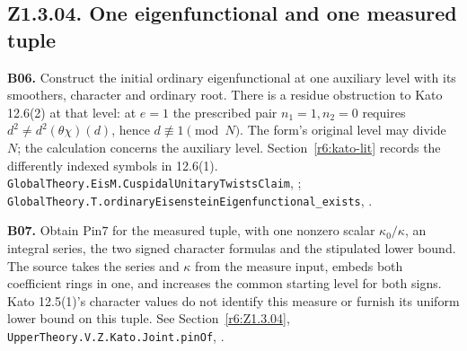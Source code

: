 \subsection{Z1.3.04. One eigenfunctional and one measured tuple}\label{r7:Z1.3.04}
\textbf{B06.} Construct the initial ordinary eigenfunctional at one
auxiliary level with its smoothers, character and ordinary root.
There is a residue obstruction to Kato 12.6(2) at that level: at
\(e=1\) the prescribed pair \(n_1=1,n_2=0\) requires
\(d^2\ne d^2(\theta\chi)(d)\), hence \(d\not\equiv1\pmod N\).
The form's original level may divide \(N\); the calculation concerns the
auxiliary level. Section~\ref{r6:kato-lit} records the differently
indexed symbols in 12.6(1).
\nolinkurl{GlobalTheory.EisM.CuspidalUnitaryTwistsClaim},
;
\nolinkurl{GlobalTheory.T.ordinaryEisensteinEigenfunctional_exists},
.

\textbf{B07.} Obtain \(\mathrm{Pin7}\) for the measured tuple, with one
nonzero scalar \(\kappa_0/\kappa\), an integral series, the two signed
character formulas and the stipulated lower bound. The source takes the
series and \(\kappa\) from the measure input, embeds both coefficient
rings in one, and increases the common starting level for both signs.
Kato 12.5(1)'s character values do not identify this measure or furnish
its uniform lower bound on this tuple. See Section~\ref{r6:Z1.3.04},
\nolinkurl{UpperTheory.V.Z.Kato.Joint.pinOf},
.

